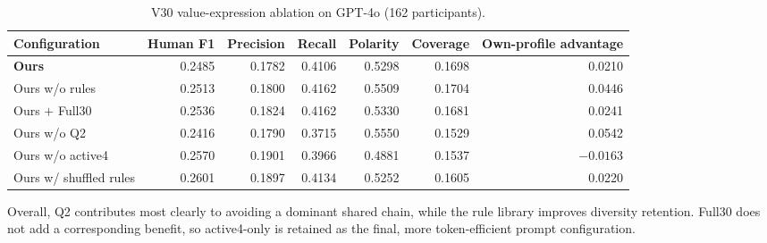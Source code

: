 \begin{table}[t]
\centering
\scriptsize
\setlength{\tabcolsep}{5pt}
\caption{V30 value-expression ablation on GPT-4o (162 participants).}
\label{tab:ablation_value_current}
\begin{tabular}{lrrrrrr}
\toprule
\textbf{Configuration} & \textbf{Human F1} & \textbf{Precision} &
\textbf{Recall} & \textbf{Polarity} & \textbf{Coverage} &
\textbf{Own-profile advantage} \\
\midrule
\textbf{Ours}          & 0.2485 & 0.1782 & 0.4106 & 0.5298 & 0.1698 & 0.0210 \\
Ours w/o rules         & 0.2513 & 0.1800 & 0.4162 & 0.5509 & 0.1704 & 0.0446 \\
Ours \(+\) Full30      & 0.2536 & 0.1824 & 0.4162 & 0.5330 & 0.1681 & 0.0241 \\
Ours w/o Q2            & 0.2416 & 0.1790 & 0.3715 & 0.5550 & 0.1529 & 0.0542 \\
Ours w/o active4       & 0.2570 & 0.1901 & 0.3966 & 0.4881 & 0.1537 & $-0.0163$ \\
Ours w/ shuffled rules & 0.2601 & 0.1897 & 0.4134 & 0.5252 & 0.1605 & 0.0220 \\
\bottomrule
\end{tabular}
\end{table}

Overall, Q2 contributes most clearly to avoiding a dominant shared chain,
while the rule library improves diversity retention. Full30 does not add a
corresponding benefit, so active4-only is retained as the final, more
token-efficient prompt configuration.
